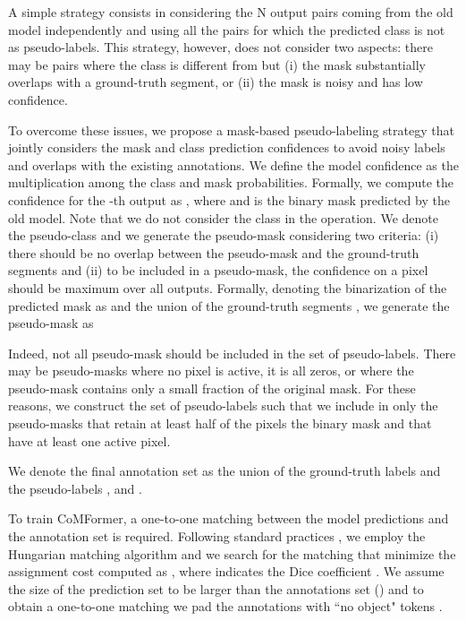 \documentclass[10pt,twocolumn,letterpaper]{article}
\begin{document}
A simple strategy consists in considering the N output pairs coming from the old model independently and using all the pairs for which the predicted class is not  as pseudo-labels. This strategy, however, does not consider two aspects: there may be pairs where the class is different from  but (i) the mask substantially overlaps with a ground-truth segment, or (ii) the mask is noisy and has low confidence.

To overcome these issues, we propose a mask-based pseudo-labeling strategy that jointly considers the mask and class prediction confidences to avoid noisy labels and overlaps with the existing annotations. 
We define the model confidence as the multiplication among the class and mask probabilities. Formally, we compute the confidence for the -th output as , where  and  is the binary mask predicted by the old model. Note that we do not consider the  class in the  operation. 
We denote the pseudo-class  and we generate the pseudo-mask  considering two criteria: (i) there should be no overlap between the pseudo-mask and the ground-truth segments and (ii) to be included in a pseudo-mask, the confidence on a pixel should be maximum over all outputs.
Formally, denoting the binarization of the predicted mask as  and the union of the ground-truth segments , we generate the pseudo-mask as


Indeed, not all pseudo-mask should be included in the set of pseudo-labels. There may be pseudo-masks where no pixel is active, \ie it is all zeros, or where the pseudo-mask contains only a small fraction of the original mask. For these reasons, we construct the set of pseudo-labels  such that we include in  only the pseudo-masks that retain at least half of the pixels \wrt the binary mask  and that have at least one active pixel.

We denote the final annotation set  as the union of the ground-truth labels  and the pseudo-labels , \ie  and . 

To train CoMFormer, a one-to-one matching  between the model predictions  and the annotation set  is required. Following standard practices \cite{carion2020end, cheng2021masked}, we employ the Hungarian matching algorithm \cite{kuhn1955hungarianmatching} and we search for the matching  that minimize the assignment cost computed as , where  indicates the Dice coefficient \cite{dice1945diceloss}.
We assume the size of the prediction set to be larger than the annotations set (\ie ) and to obtain a one-to-one matching we pad the annotations with “no object" tokens . 
\end{document}
